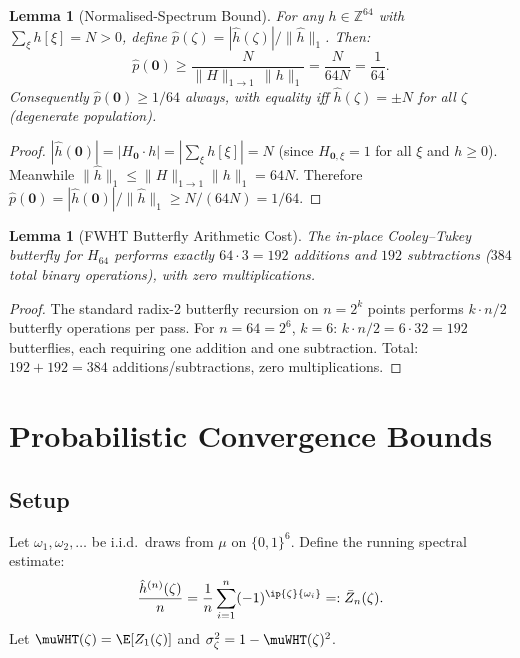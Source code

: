 \documentclass[12pt,letterpaper]{article}
\theoremstyle{definition}
\theoremstyle{plain}
\newtheorem{lemma}[theorem]{Lemma}
\theoremstyle{remark}
\newcommand{\hhat}{\hat{h}}
\begin{document}
\begin{lemma}[Normalised-Spectrum Bound]
\label{lem:norm-spec}
For any $h\in\mathbb{Z}^{64}$ with $\sum_\xi h[\xi]=N>0$, define
$\hat{p}(\zeta) = |\hhat(\zeta)|/\|\hhat\|_1$.  Then:
\[
  \hat{p}(\mathbf{0}) \ge \frac{N}{\|H\|_{1\to 1}\,\|h\|_1} = \frac{N}{64N} = \frac{1}{64}.
\]
Consequently $\hat{p}(\mathbf{0}) \ge 1/64$ always, with equality iff
$\hhat(\zeta) = \pm N$ for all $\zeta$ (degenerate population).
\end{lemma}

\begin{proof}
$|\hhat(\mathbf{0})| = |H_{\mathbf{0}}\cdot h| = |\sum_\xi h[\xi]| = N$
(since $H_{\mathbf{0},\xi}=1$ for all $\xi$ and $h\ge 0$).
Meanwhile $\|\hhat\|_1 \le \|H\|_{1\to 1}\|h\|_1 = 64N$.
Therefore $\hat{p}(\mathbf{0}) = |\hhat(\mathbf{0})|/\|\hhat\|_1 \ge N/(64N) = 1/64$.
\end{proof}

\begin{lemma}[FWHT Butterfly Arithmetic Cost]
\label{lem:butterfly-cost}
The in-place Cooley--Tukey butterfly for $H_{64}$ performs exactly
$64 \cdot 3 = 192$ additions and $192$ subtractions ($384$ total
binary operations), with zero multiplications.
\end{lemma}

\begin{proof}
The standard radix-2 butterfly recursion on $n = 2^k$ points performs
$k\cdot n/2$ butterfly operations per pass.  For $n=64=2^6$, $k=6$:
$k\cdot n/2 = 6\cdot 32 = 192$ butterflies, each requiring one addition
and one subtraction.  Total: $192+192=384$ additions/subtractions,
zero multiplications.
\end{proof}

\section{Probabilistic Convergence Bounds}

\subsection{Setup}

Let $\omega_1,\omega_2,\ldots$ be i.i.d.\ draws from $\mu$ on $\{0,1\}^6$.
Define the running spectral estimate:
\[
  \frac{\hhat^{(n)}(\zeta)}{n}
    = \frac{1}{n}\sum_{i=1}^{n}(-1)^{\ip{\zeta}{\omega_i}}
    =: \bar{Z}_n(\zeta).
\]
Let $\muWHT(\zeta) = \E[Z_1(\zeta)]$ and $\sigma_\zeta^2 = 1 - \muWHT(\zeta)^2$.
\end{document}

